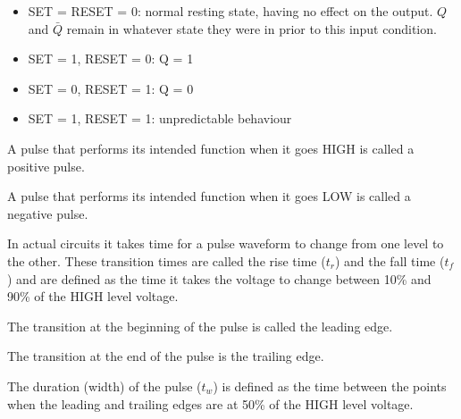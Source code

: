    \begin{itemize}
        \item SET = RESET = 0: normal resting state, having no effect on the output.
        $Q$ and $\bar{Q}$ remain in whatever state they were in prior to this input
        condition.
        \item SET = 1, RESET = 0: Q = 1
        \item SET = 0, RESET = 1: Q = 0
        \item SET = 1, RESET = 1: unpredictable behaviour
    \end{itemize}

    \par A pulse that performs its intended function when it goes HIGH is called
    a positive pulse.
    \par A pulse that performs its intended function when it goes LOW is called
    a negative pulse.
    \par In actual circuits it takes time for a pulse waveform to change from one
    level to the other. These transition times are called the rise time ($t_{r}$) and
    the fall time ($t_{f}$) and are defined as the time it takes the voltage to change
    between 10\% and 90\% of the HIGH level voltage.
    \par The transition at the beginning of the pulse is called the leading edge.
    \par The transition at the end of the pulse is the trailing edge.
    \par The duration (width) of the pulse ($t_{w}$) is defined as the time between
    the points when the leading and trailing edges are at 50\% of the HIGH level voltage.

